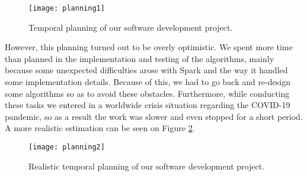 \begin{figure}[h!]
\centering
\texttt{[image: planning1]}
\caption{Temporal planning of our software development project.}
\label{fig:plan1}
\end{figure}

However, this planning turned out to be overly optimistic. We spent more time than planned in the implementation and testing of the algorithms, mainly because some unexpected difficulties arose with Spark and the way it handled some implementation details. Because of this, we had to go back and re-design some algorithms so as to avoid these obstacles. Furthermore, while conducting these tasks we entered in a worldwide crisis situation regarding the COVID-19 pandemic, so as a result the work was slower and even stopped for a short period. A more realistic estimation can be seen on Figure \ref{fig:plan2}.
\vspace{1em}
\begin{figure}[h!]
\centering
\texttt{[image: planning2]}
\caption{Realistic temporal planning of our software development project.}
\label{fig:plan2}
\end{figure}
